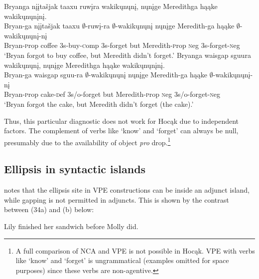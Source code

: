 \documentclass[output=paper]{LSP/langsci}
\begin{document}
\begin{exe}
\ex
\begin{xlist}
\ex
\glll Bryanga {nįįtašjak taaxu} ruwįra wakikųnųnį, nųnįge Meredithga hąąke wakikųnųnįnį.\\
Bryan-ga {nįįtašjak taaxu} $\emptyset$-ruwį-ra $\emptyset$-wakikųnųnį nųnįge Meredith-ga hąąke $\emptyset$-wakikųnųnį-nį\\
Bryan-{\textsc prop} coffee {\textsc 3s}-buy-{\textsc comp} {\textsc 3s}-forget but Meredith-{\textsc prop} {\textsc neg} {\textsc 3s}-forget-{\textsc neg}\\
\trans `Bryan forgot to buy coffee, but Meredith didn't forget.'
\ex
\glll Bryanga {waisgap sguura} wakikųnųnį, nųnįge Meredithga hąąke wakikųnųnįnį.\\
Bryan-ga {waisgap sguu-ra} $\emptyset$-wakikųnųnį nųnįge Meredith-ga hąąke $\emptyset$-wakikųnųnį-nį\\
Bryan-{\textsc prop} cake-{\textsc def} {\textsc 3s/o}-forget but Meredith-{\textsc prop} {\textsc neg} {\textsc 3s/o}-forget-{\textsc neg}\\
\trans `Bryan forgot the cake, but Meredith didn't forget (the cake).'
\end{xlist}
\end{exe}


Thus, this particular diagnostic does not work for Hocąk due to independent factors. The complement of verbs like `know' and `forget' can always be null, presumably due to the availability of object \emph{pro} drop.\footnote{A full comparison of NCA and VPE is not possible in Hocąk. VPE with verbs like `know' and `forget' is ungrammatical (examples omitted for space purposes) since these verbs are non-agentive.}

\subsection{Ellipsis in syntactic islands}

\citet{Goldberg2005} notes that the ellipsis site in VPE constructions can be inside an adjunct island, while gapping is not permitted in adjuncts. This is shown by the contrast between (34a) and (b) below:

\begin{exe}
\ex
\begin{xlist}
\ex
Lily finished her sandwich before Molly did.
\end{xlist}
\end{exe}
\end{document}
